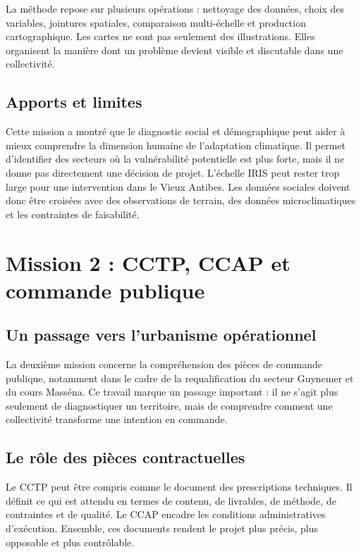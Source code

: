 \documentclass[11pt,a4paper]{report}
\begin{document}
La méthode repose sur plusieurs opérations : nettoyage des données, choix des variables, jointures spatiales, comparaison multi-échelle et production cartographique. Les cartes ne sont pas seulement des illustrations. Elles organisent la manière dont un problème devient visible et discutable dans une collectivité.

\subsection{Apports et limites}

Cette mission a montré que le diagnostic social et démographique peut aider à mieux comprendre la dimension humaine de l'adaptation climatique. Il permet d'identifier des secteurs où la vulnérabilité potentielle est plus forte, mais il ne donne pas directement une décision de projet. L'échelle IRIS peut rester trop large pour une intervention dans le Vieux Antibes. Les données sociales doivent donc être croisées avec des observations de terrain, des données microclimatiques et les contraintes de faisabilité.

\section{Mission 2 : CCTP, CCAP et commande publique}

\subsection{Un passage vers l'urbanisme opérationnel}

La deuxième mission concerne la compréhension des pièces de commande publique, notamment dans le cadre de la requalification du secteur Guynemer et du cours Masséna. Ce travail marque un passage important : il ne s'agit plus seulement de diagnostiquer un territoire, mais de comprendre comment une collectivité transforme une intention en commande.

\subsection{Le rôle des pièces contractuelles}

Le CCTP peut être compris comme le document des prescriptions techniques. Il définit ce qui est attendu en termes de contenu, de livrables, de méthode, de contraintes et de qualité. Le CCAP encadre les conditions administratives d'exécution. Ensemble, ces documents rendent le projet plus précis, plus opposable et plus contrôlable.
\end{document}
